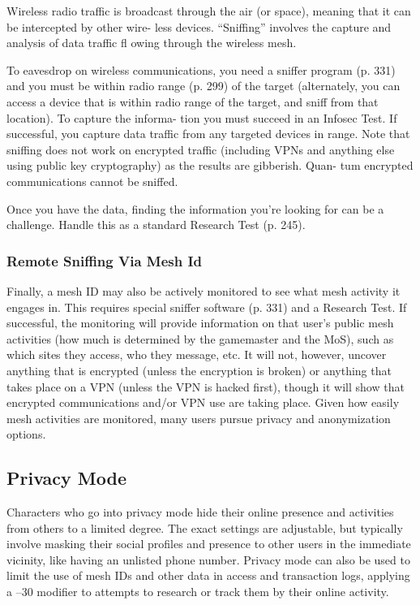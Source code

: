 Wireless radio traffic is broadcast through the air (or 
space), meaning that it can be intercepted by other wire-
less devices. ``Sniffing'' involves the capture and analysis 
of data traffic fl owing through the wireless mesh.

To eavesdrop on wireless communications, you need 
a sniffer program (p. 331) and you must be within 
radio range (p. 299) of the target (alternately, you can 
access a device that is within radio range of the target, 
and sniff from that location). To capture the informa-
tion you must succeed in an Infosec Test. If successful, 
you capture data traffic from any targeted devices in 
range. Note that sniffing does not work on encrypted 
traffic (including VPNs and anything else using public 
key cryptography) as the results are gibberish. Quan-
tum encrypted communications cannot be sniffed.

Once you have the data, finding the information 
you're looking for can be a challenge. Handle this as 
a standard Research Test (p. 245).

\subsubsection{Remote Sniffing Via Mesh Id}

Finally, a mesh ID may also be actively monitored 
to see what mesh activity it engages in. This requires 
special sniffer software (p. 331) and a Research Test. 
If successful, the monitoring will provide information 
on that user's public mesh activities (how much is 
determined by the gamemaster and the MoS), such 
as which sites they access, who they message, etc. It 
will not, however, uncover anything that is encrypted 
(unless the encryption is broken) or anything that 
takes place on a VPN (unless the VPN is hacked first), 
though it will show that encrypted communications 
and/or VPN use are taking place.
Given how easily mesh activities are monitored, many 
users pursue privacy and anonymization options.

\subsection{Privacy Mode}

Characters who go into privacy mode hide their online 
presence and activities from others to a limited degree. 
The exact settings are adjustable, but typically involve 
masking their social profiles and presence to other 
users in the immediate vicinity, like having an unlisted 
phone number. Privacy mode can also be used to limit 
the use of mesh IDs and other data in access and 
transaction logs, applying a –30 modifier to attempts 
to research or track them by their online activity.

